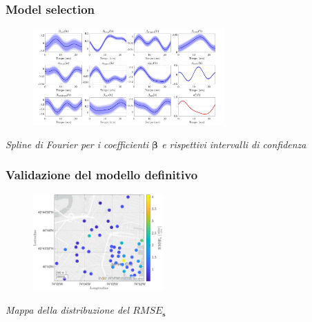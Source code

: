 \begin{frame}
	\frametitle{Model selection}
	\centering
	\begin{figure}
		\includegraphics[height=140px]{../Tesi/Immagini/4. Caso di studio/Model selection/Trend spline, rho=100m}
	\end{figure}
	\vspace{-10pt}
	\textit{Spline di Fourier per i coefficienti $\boldsymbol{\beta}$ e rispettivi intervalli di confidenza}
\end{frame}

\begin{frame}
	\frametitle{Validazione del modello definitivo}
	\centering
	
	\begin{figure}
		\includegraphics[height=140px]{../Tesi/Immagini/4. Caso di studio/LOOCV/RMSE_s}
	\end{figure}
	\vspace{-10pt}
	\textit{Mappa della distribuzione del $RMSE_\mathbf{s}$}
\end{frame}

